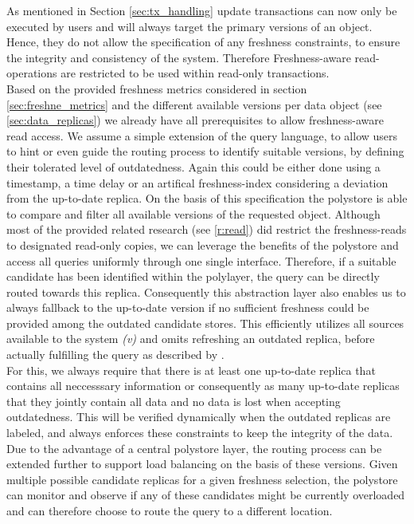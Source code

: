 As mentioned in Section \ref{sec:tx_handling} update transactions can now only be executed by users and will always target the primary versions of an object.
Hence, they do not allow the specification of any freshness constraints, to ensure the integrity and consistency of the system.
Therefore Freshness-aware read-operations are restricted to be used within read-only transactions.\\
Based on the provided freshness metrics considered in section \ref{sec:freshne_metrics} and the different available versions per data object (see \ref{sec:data_replicas})
we already have all prerequisites to allow freshness-aware read access. 
We assume a simple extension of the query language, to allow users to hint or even guide the routing process to identify suitable versions, 
by defining their tolerated level of outdatedness.
Again this could be either done using a timestamp, a time delay or an artifical freshness-index considering a deviation from the up-to-date replica.
On the basis of this specification the polystore is able to compare and filter all available versions of the requested object.
Although most of the provided related research (see \ref{r:read}) did restrict the freshness-reads to designated read-only copies, we can leverage the benefits 
of the polystore and access all queries uniformly through one single interface. Therefore, if a suitable candidate has been identified within the polylayer, 
the query can be directly routed towards this replica. Consequently this abstraction layer also enables us to always fallback to the up-to-date version
if no sufficient freshness could be provided among the outdated candidate stores. This efficiently utilizes all sources available to the system \textit{(v)}
and omits refreshing an outdated replica, before actually fulfilling the query as described by \cite{voicu:2010}.\\
For this, we always require that there is at least one up-to-date replica that contains all neccesssary information or consequently as many up-to-date replicas 
that they jointly contain all data and no data is lost when accepting outdatedness.
This will be verified dynamically when the outdated replicas are labeled, and always enforces these constraints to keep the integrity of the data.
Due to the advantage of a central polystore layer, the routing process can be extended further to support load balancing on the basis of these versions. 
Given multiple possible candidate replicas for a given freshness selection, the polystore can monitor and observe 
if any of these candidates might be currently overloaded and can therefore choose to route the query to a different location.
